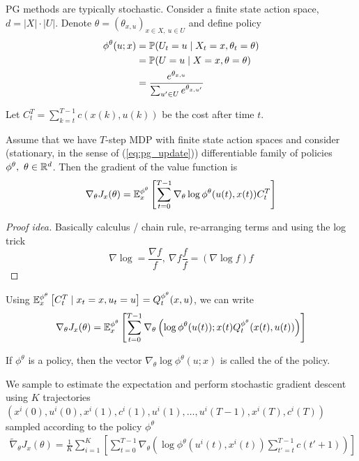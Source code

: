 PG methods are typically stochastic. Consider a finite state action space, \(d=|X|\cdot |U|\).
Denote \(\theta=(\theta_{x,u})_{x\in X,\ u\in U}\) and define  policy
\begin{align*}
    \phi^\theta(u;x)&=\mathbb{P}(U_t=u\mid X_t=x,\theta_t=\theta)\\
                    &=\mathbb{P}(U=u\mid X=x,\theta=\theta) \\
                    &=\frac{e^{\theta_{x,u}}}{\sum_{u'\in U} e^{\theta_{x,u'}}} 
\end{align*}


Let \(C_t^T=\sum_{k=t}^{T-1}c(x(k),u(k))\) be the cost after time \(t\).
\begin{theorem}\label{thm:54}
    Assume that we have \(T\)-step MDP with finite 
    state action spaces and consider (stationary, in the sense of (\ref{eq:pg_update})) differentiable family 
    of policies \(\phi^\theta,\ \theta\in \mathbb{R}^d\). Then the gradient 
    of the value function is 
    \[\nabla_\theta J_x(\theta)=\mathbb{E}_x^{\phi^\theta}\left[\sum_{t=0}^{T-1} \nabla_\theta\log \phi^\theta(u(t),x(t))C_t^T\right] \]
\end{theorem}

\begin{proof}[Proof idea]
    Basically calculus / chain rule, re-arranging terms and using the log trick 
    \[\nabla \log = \frac{\nabla f}{f},\ \nabla f\frac{f}{f}=(\nabla\log f)f\] 
\end{proof}

Using \(\mathbb{E}_x^{\phi^\theta}\left[C_t^T\mid x_t=x,u_t=u\right]=Q_t^{\phi^\theta}(x,u)\),
we can write \[\nabla_\theta J_x(\theta)=\mathbb{E}_x^{\phi^\theta}\left[\sum_{t=0}^{T-1}\nabla_\theta \left(\log \phi^\theta(u(t));x(t)Q_t^{\phi^\theta}(x(t),u(t))\right)\right]\]
\begin{definition}\label{def:55}
    If \(\phi^\theta\) is a policy, then the vector \(\nabla_\theta\log\phi^\theta(u;x)\)
    is  called the  of the policy.
\end{definition}

We sample to estimate the expectation and perform stochastic gradient descent using 
\(K\) trajectories \((x^i(0),u^i(0),x^i(1),c^i(1),u^i(1),\dots, u^i(T-1),x^i(T),c^i(T))\) sampled according to
the policy \(\phi^\theta\)
\begin{align*}
    \tilde{\nabla}_\theta J_x(\theta)=\frac{1}{K}\sum_{i=1}^K\left[\sum_{t=0}^{T-1}\nabla_\theta \left(\log \phi^\theta(u^i(t),x^i(t))\sum_{t'=t}^{T-1}c(t'+1)\right)\right]
\end{align*}


